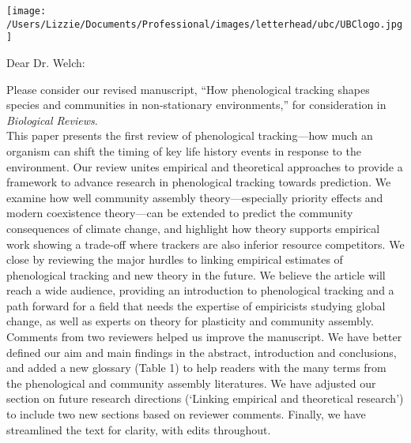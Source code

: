 \documentclass[11pt,a4paper]{letter}
\begin{document}
\begin{letter}{}
    \begin{flushright}
\texttt{[image: /Users/Lizzie/Documents/Professional/images/letterhead/ubc/UBClogo.jpg]}\\
    \end{flushright}
\opening{Dear Dr. Welch:}
Please consider our revised manuscript, ``How phenological tracking shapes species and communities in non-stationary environments,'' for consideration in \emph{Biological Reviews}.
\vspace{1.5ex}\\
This paper presents the first review of phenological tracking---how much an organism can shift the timing of key life history events in response to the environment. %
Our review unites empirical and theoretical approaches to provide a framework to advance research in phenological tracking towards prediction. We examine how well community assembly theory---especially priority effects and modern coexistence theory---can be extended to predict the community consequences of climate change, and highlight how theory supports empirical work showing a trade-off where trackers are also inferior resource competitors. We close by reviewing the major hurdles to linking empirical estimates of phenological tracking and new theory in the future. We believe the article will reach a wide audience, providing an introduction to phenological tracking and a path forward for a field that needs the expertise of empiricists studying global change, as well as experts on theory for plasticity and community assembly.
\vspace{1.5ex}\\
Comments from two reviewers helped us improve the manuscript. We have better defined our aim and main findings in the abstract, introduction and conclusions, and added a new glossary (Table 1) to help readers with the many terms from the phenological and community assembly literatures. We have adjusted our section on future research directions (`Linking empirical and theoretical research') to include two new sections based on reviewer comments. Finally, we have streamlined the text for clarity, with edits throughout. 

\end{letter}
\end{document}

